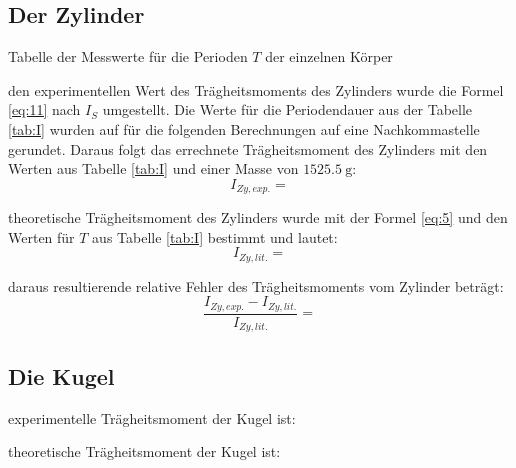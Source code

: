 \subsection{Der Zylinder}\justifying %

\begin{table}[H]
    \centering
    
    \caption{Tabelle der Messwerte für die Perioden $T$ der einzelnen Körper}
    \label{tab:I}
\end{table}


\justifying den experimentellen Wert des Trägheitsmoments des Zylinders wurde die Formel \eqref{eq:11} nach $I_S$ umgestellt.
Die Werte für die Periodendauer aus der Tabelle \ref{tab:I} wurden auf für die folgenden Berechnungen auf eine Nachkommastelle gerundet.
Daraus folgt das errechnete Trägheitsmoment des Zylinders mit den Werten aus Tabelle \ref{tab:I} und einer Masse von $\SI{1525.5}{\gram}$:
\begin{equation}
I_{Zy, exp.} = \label{eq:18}
\end{equation}

\justifying theoretische Trägheitsmoment des Zylinders wurde mit der Formel \eqref{eq:5} und den Werten für $T$ aus Tabelle 
\ref{tab:I} bestimmt und lautet:
\begin{equation}
I_{Zy, lit.} = \label{eq:19}
\end{equation}

\justifying daraus resultierende relative Fehler des Trägheitsmoments vom Zylinder beträgt:
\begin{equation}
\frac{I_{Zy, exp.} - I_{Zy, lit.}}{I_{Zy, lit.}} = \label{eq:20}
\end{equation}
\newpage

\subsection{Die Kugel}\justifying %

\justifying experimentelle Trägheitsmoment der Kugel ist:


\justifying theoretische Trägheitsmoment der Kugel ist:


